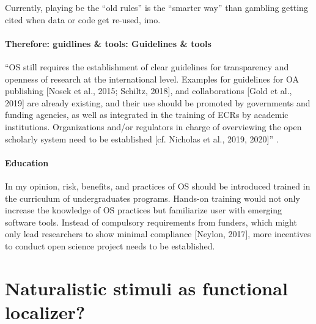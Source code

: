 %
Currently, playing be the ``old rules'' is the ``smarter way'' than gambling
getting cited when data or code get re-used, imo.


\paragraph{Therefore: guidlines \& tools: Guidelines \& tools}


%
``OS still requires the establishment of clear guidelines for transparency and
openness of research at the international level.
%
Examples for guidelines for OA publishing [Nosek et al., 2015; Schiltz, 2018],
and collaborations [Gold et al., 2019] are already existing, and their use
should be promoted by governments and funding agencies, as well as integrated in
the training of ECRs by academic institutions.
%
Organizations and/or regulators in charge of overviewing the open scholarly
system need to be established [cf. Nicholas et al., 2019, 2020]''
\citep{toribio2021early}.


\paragraph{Education}


In my opinion, risk, benefits, and practices of OS should be introduced trained
in the curriculum of undergraduates programs.
%
Hands-on training would not only increase the knowledge of OS practices but
familiarize user with emerging software tools.
%
Instead of compulsory requirements from funders, which might only lead
researchers to show minimal compliance [Neylon, 2017], more incentives to
conduct open science project needs to be established.



\section{Naturalistic stimuli as functional localizer?}

